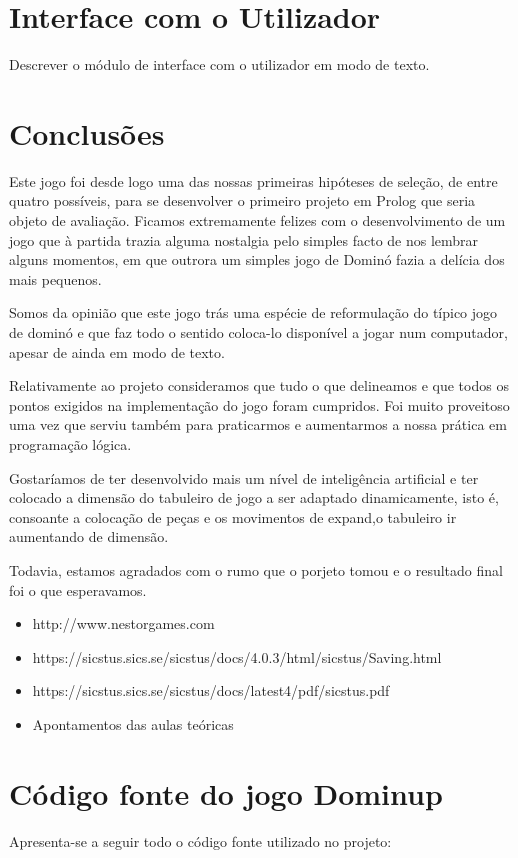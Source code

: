 \documentclass[a4paper]{article}
\begin{document}
\section{Interface com o Utilizador}

Descrever o módulo de interface com o utilizador em modo de texto.


\section{Conclusões}

Este jogo foi desde logo uma das nossas primeiras hipóteses de seleção, de entre quatro possíveis, para se desenvolver o primeiro projeto em Prolog que seria objeto de avaliação. Ficamos extremamente felizes com o desenvolvimento de um jogo que à partida trazia alguma nostalgia pelo simples facto de nos lembrar alguns momentos, em que outrora um simples jogo de Dominó fazia a delícia dos mais pequenos. 

Somos da opinião que este jogo trás uma espécie de reformulação do típico jogo de dominó e que faz todo o sentido coloca-lo disponível a jogar num computador, apesar de ainda em modo de texto.

Relativamente ao projeto consideramos que tudo o que delineamos e que todos os pontos exigidos na implementação do jogo foram cumpridos. Foi muito proveitoso uma vez que serviu também para praticarmos e aumentarmos a nossa prática em programação lógica.

Gostaríamos de ter desenvolvido mais um nível de inteligência artificial e ter colocado a dimensão do tabuleiro de jogo a ser adaptado dinamicamente, isto é, consoante a colocação de peças e os movimentos de expand,o tabuleiro ir aumentando de dimensão.

Todavia, estamos agradados com o rumo que o porjeto tomou e o resultado final foi o que esperavamos.



\clearpage
{}
\renewcommand\refname{Bibliografia}


\begin{itemize}
	\item http://www.nestorgames.com
	\item https://sicstus.sics.se/sicstus/docs/4.0.3/html/sicstus/Saving.html
	\item https://sicstus.sics.se/sicstus/docs/latest4/pdf/sicstus.pdf
	\item Apontamentos das aulas teóricas
\end{itemize}

\newpage
\appendix
\section{Código fonte do jogo Dominup}
Apresenta-se a seguir todo o código fonte utilizado no projeto:
\end{document}
